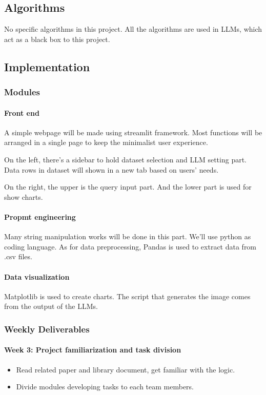 \documentclass[conference]{IEEEtran}
\begin{document}
    \subsection{Algorithms}
    No specific algorithms in this project. All the algorithms are used in LLMs, which act as a black box to this project.

    \subsection{Implementation}
        \subsubsection{Modules}
            \paragraph{Front end}
                A simple webpage will be made using streamlit framework. Most functions will be arranged in a single page to keep the minimalist user experience.

                On the left, there's a sidebar to hold dataset selection and LLM setting part. Data rows in dataset will shown in a new tab based on users' needs.

                On the right, the upper is the query input part. And the lower part is used for show charts.

            \paragraph{Propmt engineering}
                Many string manipulation works will be done in this part. We'll use python as coding language. As for data preprocessing, Pandas is used to extract data from .csv files.

            \paragraph{Data visualization}
                Matplotlib is used to create charts. The script that generates the image comes from the output of the LLMs.

        \subsubsection{Weekly Deliverables}
            \paragraph{Week 3: Project familiarization and task division}
                \begin{itemize}
                    \item Read related paper and library document, get familiar with the logic.
                    \item Divide modules developing tasks to each team members.
                \end{itemize}
\end{document}
